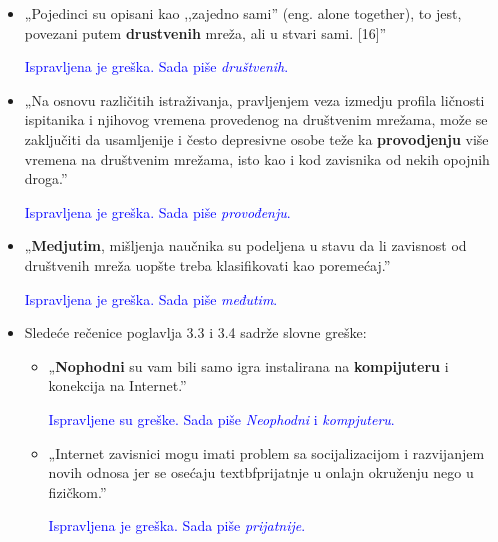 \documentclass[a4paper]{report}
\newcommand{\odgovor}[1]{\textcolor{blue}{#1}}
\begin{document}
\begin{itemize}
\begin{itemize}
    \end{itemize}
    \begin{itemize}
        \item  „Pojedinci su opisani kao ,,zajedno sami” (eng. alone together), to jest, povezani putem \textbf{drustvenih} mreža, ali u stvari sami. [16]”
        
        \odgovor{Ispravljena je greška. Sada piše \textit{društvenih}.}
        
    \end{itemize}
    \begin{itemize}
        \item  „Na osnovu različitih istraživanja, pravljenjem veza izmedju profila ličnosti ispitanika i njihovog vremena provedenog na društvenim mrežama, može se zaključiti da usamljenije i često depresivne osobe teže ka \textbf{provodjenju} više vremena na društvenim mrežama, isto kao i kod zavisnika od nekih opojnih droga.”
        
        \odgovor{Ispravljena je greška. Sada piše \textit{provođenju}.}
        
        
    \end{itemize}
    \begin{itemize}
        \item  „\textbf{Medjutim}, mišljenja naučnika su podeljena u stavu da li zavisnost od društvenih mreža uopšte treba klasifikovati kao poremećaj.”
        
        \odgovor{Ispravljena je greška. Sada piše \textit{međutim}.}
        
    \end{itemize}
\end{itemize}
\begin{itemize}
    \item Sledeće rečenice poglavlja 3.3 i 3.4 sadrže slovne greške:\newline
    \begin{itemize}
        \item „\textbf{Nophodni} su vam bili samo igra instalirana na \textbf{kompijuteru} i konekcija na Internet.”
        
        \odgovor{Ispravljene su greške. Sada piše \textit{Neophodni} i \textit{kompjuteru}.}
        
        
    \end{itemize}
    \begin{itemize}
        \item  „Internet zavisnici mogu imati problem sa socijalizacijom i razvijanjem novih odnosa jer se osećaju textbf{prijatnje} u onlajn okruženju nego u fizičkom.”
        
        \odgovor{Ispravljena je greška. Sada piše \textit{prijatnije}.}
        
    \end{itemize}
\end{itemize}
\end{document}
